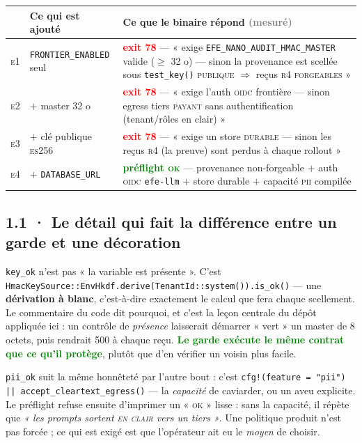 \documentclass[10pt]{article}
\newcommand{\best}[1]{\textcolor{green}{\textbf{#1}}}
\newcommand{\pire}[1]{\textcolor{red}{\textbf{#1}}}
\newcommand{\sz}[1]{\textcolor{grey}{\small\textsf{#1}}}
\newcommand{\code}[1]{\texttt{\small #1}}
\begin{document}
\begin{center}\small
\renewcommand{\arraystretch}{1.3}
\begin{tabular}{@{}c >{\raggedright\arraybackslash}p{4.3cm} >{\raggedright\arraybackslash}p{10.2cm}@{}}
\toprule
& \textbf{Ce qui est ajouté} & \textbf{Ce que le binaire répond} \sz{(mesuré)} \\
\midrule
\textsc{e}1 & \code{FRONTIER\_ENABLED} seul & \pire{exit 78} --- « exige \code{EFE\_NANO\_AUDIT\_HMAC\_MASTER} valide ($\geq$ 32 o) --- sinon la provenance est scellée sous \code{test\_key()} \textsc{publique} $\Rightarrow$ reçus \textsc{r}4 \textsc{forgeables} » \\
\textsc{e}2 & $+$ master 32 o & \pire{exit 78} --- « exige l'auth \textsc{oidc} frontière --- sinon egress tiers \textsc{payant} sans authentification (tenant/rôles en clair) » \\
\textsc{e}3 & $+$ clé publique \textsc{es}256 & \pire{exit 78} --- « exige un store \textsc{durable} --- sinon les reçus \textsc{r}4 (la preuve) sont perdus à chaque rollout » \\
\textsc{e}4 & $+$ \code{DATABASE\_URL} & \best{préflight \textsc{ok}} --- provenance non-forgeable $+$ auth \textsc{oidc} \code{efe-llm} $+$ store durable $+$ capacité \textsc{pii} compilée \\
\bottomrule
\end{tabular}
\end{center}

\subsection{1.1 · Le détail qui fait la différence entre un garde et une décoration}

\code{key\_ok} n'est pas « la variable est présente ». C'est
\code{HmacKeySource::EnvHkdf.derive(TenantId::system()).is\_ok()} --- une \textbf{dérivation à
blanc}, c'est-à-dire exactement le calcul que fera chaque scellement. Le commentaire du code dit
pourquoi, et c'est la leçon centrale du dépôt appliquée ici : un contrôle de \emph{présence}
laisserait démarrer « vert » un master de 8 octets, puis rendrait 500 à chaque reçu. \best{Le garde
exécute le même contrat que ce qu'il protège}, plutôt que d'en vérifier un voisin plus facile.

\code{pii\_ok} suit la même honnêteté par l'autre bout : c'est
\code{cfg!(feature = "pii") || accept\_cleartext\_egress()} --- la \emph{capacité} de caviarder, ou
un aveu explicite. Le préflight refuse ensuite d'imprimer un « \textsc{ok} » lisse : sans la
capacité, il répète que \emph{« les prompts sortent \textsc{en clair} vers un tiers »}. Une
politique produit n'est pas forcée ; ce qui est exigé est que l'opérateur ait eu le \emph{moyen} de
choisir.
\end{document}
